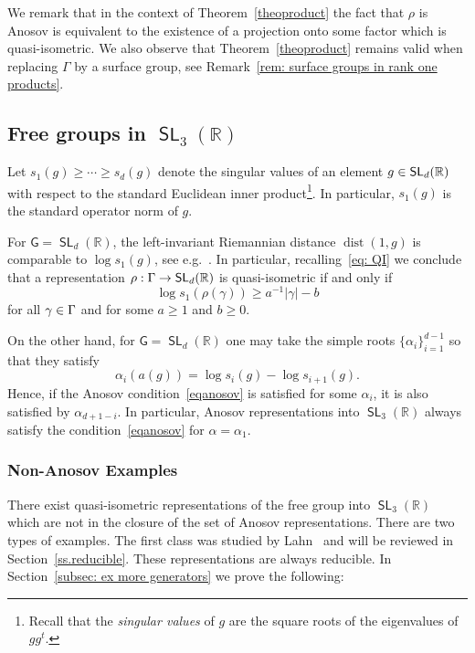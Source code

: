 \documentclass[AHL,Unicode,longabstracts]{cedram}
\DeclareMathOperator{\SL}{\mathsf{SL}}
\DeclareMathOperator{\dist}{dist}
\newcommand{\R}{\mathbb{R}}
\newcommand{\sG}{\mathsf{G}}
\renewcommand*{\to}{\mathchoice{\longrightarrow}{\rightarrow}{\rightarrow}{\rightarrow}}
\let\oldin\in
\renewcommand{\in}{\mathchoice{\oldin}{\oldin}{\,\oldin\,}{\,\oldin\,}}
\begin{document}
We remark that in the context of Theorem~\ref{theoproduct} the fact that $\rho$ is Anosov is equivalent to the existence of a projection onto some factor which is quasi-isometric. We also observe that Theorem~\ref{theoproduct} remains valid when replacing $\Gamma$ by a surface group, see Remark~\ref{rem: surface groups in rank one products}.


\subsection{Free groups in $\SL_3(\R)$}


Let $s_1(g) \ge \cdots \ge s_d(g)$ denote the singular values of an element $g\in\SL_d(\R)$ with respect to the standard Euclidean inner product\footnote{Recall that the \emph{singular values} of $g$ are the square roots of the eigenvalues of $gg^t$.}. In particular, $s_1(g)$ is the standard operator norm of $g$.

For $\sG = \SL_d(\R)$, the left-invariant Riemannian distance $\dist(1,g)$ is comparable to $\log s_1(g)$, see e.g.~\cite[Section~7.7]{BPS}. In particular, recalling~\eqref{eq: QI} we conclude that a representation $\rho:\Gamma\to\SL_d(\R)$ is quasi-isometric if and only if
\begin{equation}\label{eq: QI in SLd}
\log s_1(\rho(\gamma))\geq a^{-1}\vert\gamma\vert-b
\end{equation}
for all $\gamma\in\Gamma$ and for some $a\geq 1$ and $b\geq 0$.

On the other hand, for $\sG=\SL_d(\R)$ one may take the simple roots $\{\alpha_i\}_{i=1}^{d-1}$ so that they satisfy
\[
\alpha_i(a(g)) = \log s_{i}(g) - \log s_{i+1}(g).
\]
Hence, if the Anosov condition~\eqref{eqanosov} is satisfied for some $\alpha_i$, it is also satisfied by $\alpha_{d+1-i}$. In particular, Anosov representations into $\SL_3(\R)$ always satisfy the condition~\eqref{eqanosov} for $\alpha=\alpha_1$.



\subsubsection{Non-Anosov Examples}\label{subsec: non anosov examples intro}

There exist quasi-isometric representations of the free group into $\SL_3(\R)$ which are not in the closure of the set of Anosov representations. There are two types of examples. The first class was studied by Lahn~\cite{lahn} and will be reviewed in Section~\ref{ss.reducible}. These representations are always reducible. In Section~\ref{subsec: ex more generators} we prove the following:
\end{document}
